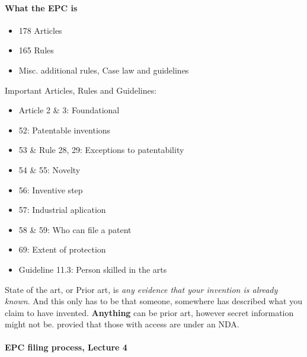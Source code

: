 \documentclass[12pt]{article} %
\begin{document}
\paragraph{What the EPC is}

\begin{itemize}
    \item 178 Articles
    \item 165 Rules
    \item Misc. additional rules, Case law and guidelines
\end{itemize}

Important Articles, Rules and Guidelines:
\begin{itemize}
    \item Article 2 \& 3: Foundational
    \item 52: Patentable inventions
    \item 53 \& Rule 28, 29: Exceptions to patentability 
    \item 54 \& 55: Novelty
    \item 56: Inventive step
    \item 57: Industrial aplication
    \item 58 \& 59: Who can file a patent
    \item 69: Extent of protection
    \item Guideline 11.3: Person skilled in the arts
\end{itemize}

State of the art, or Prior art, is \textit{any evidence that your invention is already known}.
And this only has to be that someone, somewhere has described what you claim to have invented.
\textbf{Anything} can be prior art, however secret information might not be. provied that those with access are under an NDA.

\paragraph{EPC filing process, Lecture 4}
\end{document}
